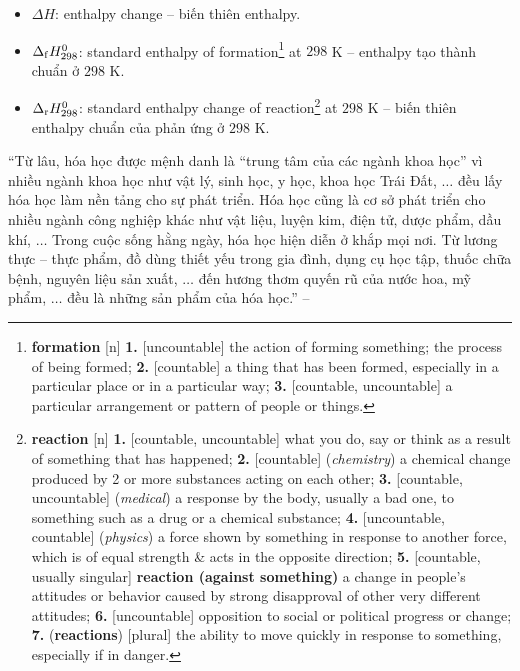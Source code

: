 \documentclass[oneside]{book}
\numberwithin{equation}{section}
\begin{document}
\begin{itemize}
	\item $\Delta H$: enthalpy change -- biến thiên enthalpy.
	\item $\Delta_{\rm f}H_{298}^0$: standard enthalpy of formation\footnote{\textbf{formation} [n] \textbf{1.} [uncountable] the action of forming something; the process of being formed; \textbf{2.} [countable] a thing that has been formed, especially in a particular place or in a particular way; \textbf{3.} [countable, uncountable] a particular arrangement or pattern of people or things.} at $298$ K -- enthalpy tạo thành chuẩn ở $298$ K.
	\item $\Delta_{\rm r}H_{298}^0$: standard enthalpy change of reaction\footnote{\textbf{reaction} [n] \textbf{1.} [countable, uncountable] what you do, say or think as a result of something that has happened; \textbf{2.} [countable] (\textit{chemistry}) a chemical change produced by 2 or more substances acting on each other; \textbf{3.} [countable, uncountable] (\textit{medical}) a response by the body, usually a bad one, to something such as a drug or a chemical substance; \textbf{4.} [uncountable, countable] (\textit{physics}) a force shown by something in response to another force, which is of equal strength \& acts in the opposite direction; \textbf{5.} [countable, usually singular] \textbf{reaction (against something)} a change in people's attitudes or behavior caused by strong disapproval of other very different attitudes; \textbf{6.} [uncountable] opposition to social or political progress or change; \textbf{7.} (\textbf{reactions}) [plural] the ability to move quickly in response to something, especially if in danger.} at $298$ K -- biến thiên enthalpy chuẩn của phản ứng ở $298$ K.
\end{itemize}
``Từ lâu, hóa học được mệnh danh là ``trung tâm của các ngành khoa học'' vì nhiều ngành khoa học như vật lý, sinh học, y học, khoa học Trái Đất, $\ldots$ đều lấy hóa học làm nền tảng cho sự phát triển. Hóa học cũng là cơ sở phát triển cho nhiều ngành công nghiệp khác như vật liệu, luyện kim, điện tử, dược phẩm, dầu khí, $\ldots$ Trong cuộc sống hằng ngày, hóa học hiện diễn ở khắp mọi nơi. Từ lương thực -- thực phẩm, đồ dùng thiết yếu trong gia đình, dụng cụ học tập, thuốc chữa bệnh, nguyên liệu sản xuất, $\ldots$ đến hương thơm quyến rũ của nước hoa, mỹ phẩm, $\ldots$ đều là những sản phẩm của hóa học.'' -- \cite[p. 3]{SGK_Hoa_Hoc_10_Chan_Troi_Sang_Tao}

\end{document}
